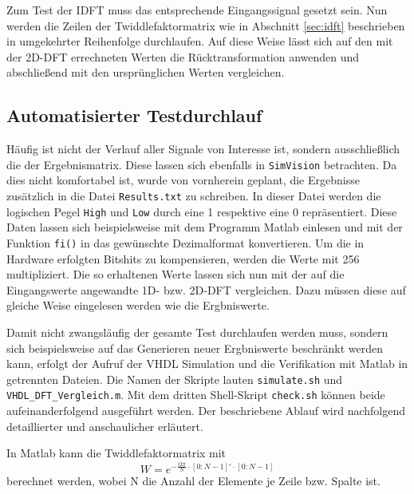 Zum Test der IDFT muss das entsprechende Eingangssignal gesetzt sein. Nun werden die Zeilen der Twiddlefaktormatrix wie in Abschnitt \ref{sec:idft} beschrieben 
in umgekehrter Reihenfolge durchlaufen. Auf diese Weise lässt sich auf den mit der 2D-DFT errechneten Werten die Rücktransformation anwenden und abschließend mit den
ursprünglichen Werten vergleichen.

\subsection{Automatisierter Testdurchlauf}\label{sec:automatisierterTestdurchlauf}
Häufig ist nicht der Verlauf aller Signale von Interesse ist, sondern ausschließlich die der Ergebnismatrix. Diese lassen sich ebenfalls in \texttt{SimVision} betrachten.
Da dies nicht komfortabel ist, wurde von vornherein geplant, die Ergebnisse zusätzlich in die Datei \texttt{Results.txt} zu schreiben.
In dieser Datei werden die logischen Pegel \texttt{High} und \texttt{Low} durch eine 1 respektive eine 0 repräsentiert. Diese Daten lassen sich beispielsweise mit
dem Programm Matlab einlesen und mit der Funktion \texttt{fi()} in das gewünschte Dezimalformat konvertieren. Um die in Hardware erfolgten Bitshits zu kompensieren,
werden die Werte mit 256 multipliziert. Die so erhaltenen Werte lassen sich nun mit der auf die Eingangswerte angewandte 1D- bzw. 2D-DFT vergleichen. Dazu müssen
diese auf gleiche Weise eingelesen werden wie die Ergbniswerte.

Damit nicht zwangsläufig der gesamte Test durchlaufen werden muss, sondern sich beispielsweise auf das Generieren neuer Ergbniswerte beschränkt werden kann,
erfolgt der Aufruf der VHDL Simulation und die Verifikation mit Matlab in getrennten Dateien. Die Namen der Skripte lauten \texttt{simulate.sh} und \texttt{VHDL\_DFT\_Vergleich.m}. 
Mit dem dritten Shell-Skript \texttt{check.sh} können beide aufeinanderfolgend ausgeführt werden. Der beschriebene Ablauf wird nachfolgend detaillierter und anschaulicher erläutert.

In Matlab kann die Twiddlefaktormatrix mit
\[ W = e^{-\frac{i 2 \pi}{N}\cdot[0:N-1]'\cdot[0:N-1]} \]
berechnet werden, wobei N die Anzahl der Elemente je Zeile bzw. Spalte ist. 

